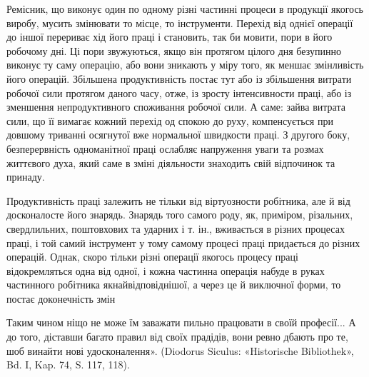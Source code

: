 Ремісник, що виконує один по одному різні частинні процеси
в продукції якогось виробу, мусить змінювати то місце, то інструменти. Перехід від однієї операції
до іншої перериває хід його праці і становить, так би мовити, пори в його робочому дні. Ці пори
звужуються, якщо він протягом цілого дня безупинно
виконує ту саму операцію, або вони зникають у міру того, як
меншає змінливість його операцій. Збільшена продуктивність
постає тут або із збільшення витрати робочої сили протягом
даного часу, отже, із зросту інтенсивности праці, або із зменшення
непродуктивного споживання робочої сили. А саме: зайва витрата
сили, що її вимагає кожний перехід од спокою до руху, компенсується при довшому триванні осягнутої
вже нормальної швидкости
праці. З другого боку, безперервність одноманітної праці ослабляє
напруження уваги та розмах життєвого духа, який саме в зміні
діяльности знаходить свій відпочинок та принаду.

Продуктивність праці залежить не тільки від віртуозности
робітника, але й від досконалосте його знарядь. Знарядь того
самого роду, як, приміром, різальних, свердлильних, поштовхових та ударних і т. ін., вживається в
різних процесах праці, і той самий інструмент у тому самому процесі праці придається до різних
операцій. Однак, скоро тільки різні операції якогось
процесу праці відокремляться одна від одної, і кожна частинна
операція набуде в руках частинного робітника якнайвідповіднішої, а через це й виключної форми, то
постає доконечність змін

Таким чином ніщо не може їм заважати пильно працювати в своїй професії... А до того, діставши багато
правил від своїх прадідів, вони ревно
дбають про те, шоб винайти нові удосконалення». (Diodorus Siculus:
«Historische Bibliothek», Bd. I, Kap. 74, S. 117, 118).
\parbreak{}  %
